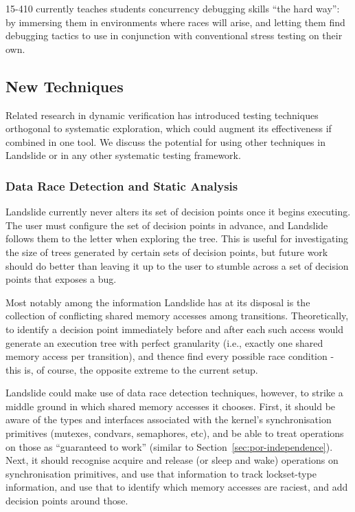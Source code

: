 15-410 currently teaches students concurrency debugging skills ``the hard way'': by immersing them in environments where races will arise, and letting them find debugging tactics to use in conjunction with conventional stress testing on their own.

\subsection{New Techniques}
\label{sec:future-new}

Related research in dynamic verification has introduced testing techniques orthogonal to systematic exploration, which could augment its effectiveness if combined in one tool. We discuss the potential for using other techniques in Landslide or in any other systematic testing framework.

\subsubsection{Data Race Detection and Static Analysis}

Landslide currently never alters its set of decision points once it begins executing. The user must configure the set of decision points in advance, and Landslide follows them to the letter when exploring the tree. This is useful for investigating the size of trees generated by certain sets of decision points, but future work should do better than leaving it up to the user to stumble across a set of decision points that exposes a bug.

Most notably among the information Landslide has at its disposal is the collection of conflicting shared memory accesses among transitions. Theoretically, to identify a decision point immediately before and after each such access would generate an execution tree with perfect granularity (i.e., exactly one shared memory access per transition), and thence find every possible race condition - this is, of course, the opposite extreme to the current setup.

Landslide could make use of data race detection techniques\cite{datacollider}, however, to strike a middle ground in which shared memory accesses it chooses. First, it should be aware of the types and interfaces associated with the kernel's synchronisation primitives (mutexes, condvars, semaphores, etc), and be able to treat operations on those as ``guaranteed to work'' (similar to Section~\ref{sec:por-independence}).
Next, it should recognise acquire and release (or sleep and wake) operations on synchronisation primitives, and use that information to track lockset-type information, and use that to identify which memory accesses are raciest, and add decision points around those.

